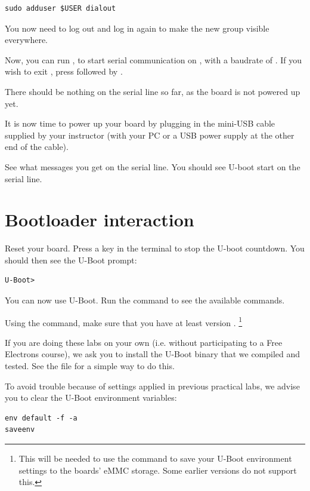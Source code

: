 \begin{verbatim}
sudo adduser $USER dialout
\end{verbatim}

You now need to log out and log in again to make the new group
visible everywhere.

Now, you can run , to start serial
communication on , with a baudrate of . If
you wish to exit , press \code{[Ctrl][a]} followed by
\code{[Ctrl][x]}.

There should be nothing on the serial line so far, as the board is not
powered up yet.

It is now time to power up your board by plugging in the mini-USB
cable supplied by your instructor (with your PC or a USB power supply at the
other end of the cable).

See what messages you get on the serial line. You should see U-boot
start on the serial line.

\section{Bootloader interaction}

Reset your board. Press a key in the  terminal to stop the U-boot
countdown. You should then see the U-Boot prompt:
\begin{verbatim}
U-Boot>
\end{verbatim}

You can now use U-Boot. Run the  command to see the available
commands.

Using the  command, make sure that you have at least version
.
\footnote{This will be needed to use the  command to
save your U-Boot environment settings to the boards' eMMC storage.
Some earlier versions do not support this.} 

If you are doing these labs on your own (i.e. without participating to a Free Electrons
course), we ask you to install the U-Boot binary that we compiled and
tested. See the 
file for a simple way to do this.

To avoid trouble because of settings applied in previous practical labs,
we advise you to clear the U-Boot environment variables:

\begin{verbatim}
env default -f -a
saveenv
\end{verbatim}

